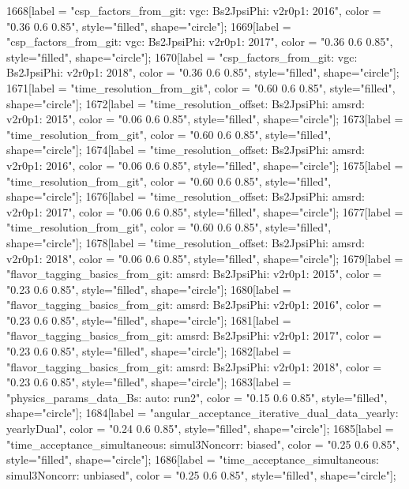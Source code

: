 {	1668[label = "csp_factors_from_git\ncsp: vgc\nmode: Bs2JpsiPhi\nversion: v2r0p1\nyear: 2016", color = "0.36 0.6 0.85", style="filled", shape="circle"];
	1669[label = "csp_factors_from_git\ncsp: vgc\nmode: Bs2JpsiPhi\nversion: v2r0p1\nyear: 2017", color = "0.36 0.6 0.85", style="filled", shape="circle"];
	1670[label = "csp_factors_from_git\ncsp: vgc\nmode: Bs2JpsiPhi\nversion: v2r0p1\nyear: 2018", color = "0.36 0.6 0.85", style="filled", shape="circle"];
	1671[label = "time_resolution_from_git", color = "0.60 0.6 0.85", style="filled", shape="circle"];
	1672[label = "time_resolution_offset\nmode: Bs2JpsiPhi\ntimeres: amsrd\nversion: v2r0p1\nyear: 2015", color = "0.06 0.6 0.85", style="filled", shape="circle"];
	1673[label = "time_resolution_from_git", color = "0.60 0.6 0.85", style="filled", shape="circle"];
	1674[label = "time_resolution_offset\nmode: Bs2JpsiPhi\ntimeres: amsrd\nversion: v2r0p1\nyear: 2016", color = "0.06 0.6 0.85", style="filled", shape="circle"];
	1675[label = "time_resolution_from_git", color = "0.60 0.6 0.85", style="filled", shape="circle"];
	1676[label = "time_resolution_offset\nmode: Bs2JpsiPhi\ntimeres: amsrd\nversion: v2r0p1\nyear: 2017", color = "0.06 0.6 0.85", style="filled", shape="circle"];
	1677[label = "time_resolution_from_git", color = "0.60 0.6 0.85", style="filled", shape="circle"];
	1678[label = "time_resolution_offset\nmode: Bs2JpsiPhi\ntimeres: amsrd\nversion: v2r0p1\nyear: 2018", color = "0.06 0.6 0.85", style="filled", shape="circle"];
	1679[label = "flavor_tagging_basics_from_git\nflavor: amsrd\nmode: Bs2JpsiPhi\nversion: v2r0p1\nyear: 2015", color = "0.23 0.6 0.85", style="filled", shape="circle"];
	1680[label = "flavor_tagging_basics_from_git\nflavor: amsrd\nmode: Bs2JpsiPhi\nversion: v2r0p1\nyear: 2016", color = "0.23 0.6 0.85", style="filled", shape="circle"];
	1681[label = "flavor_tagging_basics_from_git\nflavor: amsrd\nmode: Bs2JpsiPhi\nversion: v2r0p1\nyear: 2017", color = "0.23 0.6 0.85", style="filled", shape="circle"];
	1682[label = "flavor_tagging_basics_from_git\nflavor: amsrd\nmode: Bs2JpsiPhi\nversion: v2r0p1\nyear: 2018", color = "0.23 0.6 0.85", style="filled", shape="circle"];
	1683[label = "physics_params_data_Bs\nfit: auto\nyear: run2", color = "0.15 0.6 0.85", style="filled", shape="circle"];
	1684[label = "angular_acceptance_iterative_dual_data_yearly\nangacc: yearlyDual", color = "0.24 0.6 0.85", style="filled", shape="circle"];
	1685[label = "time_acceptance_simultaneous\ntimeacc: simul3Noncorr\ntrigger: biased", color = "0.25 0.6 0.85", style="filled", shape="circle"];
	1686[label = "time_acceptance_simultaneous\ntimeacc: simul3Noncorr\ntrigger: unbiased", color = "0.25 0.6 0.85", style="filled", shape="circle"];
}
